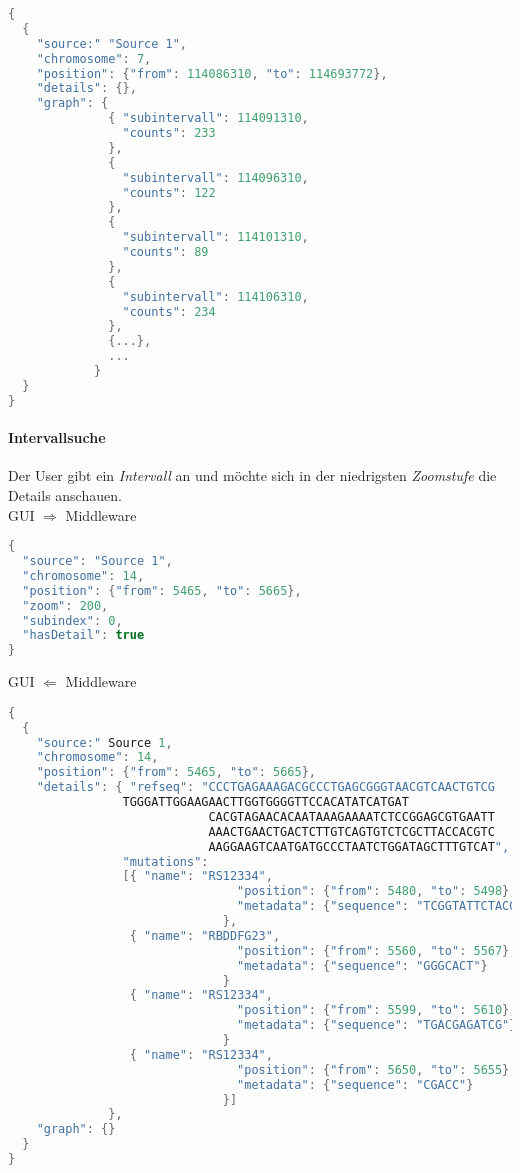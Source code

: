 \documentclass{scrartcl}
\begin{document}
\begin{lstlisting}[language=c,
commentstyle=\fontsize{12}{14.4}\selectfont,
basicstyle=\ttfamily\fontsize{10}{12}\selectfont, showstringspaces=false]
{
  {
    "source:" "Source 1",
    "chromosome": 7,
    "position": {"from": 114086310, "to": 114693772},
    "details": {},
    "graph": {
              { "subintervall": 114091310,
                "counts": 233
              },
              {
                "subintervall": 114096310,
                "counts": 122
              },
              {
                "subintervall": 114101310,
                "counts": 89
              },
              {
                "subintervall": 114106310,
                "counts": 234
              },
              {...},
              ...
            }
  }
}
\end{lstlisting}

\paragraph{Intervallsuche} Der User gibt ein \textit{Intervall} an und möchte sich in der niedrigsten \textit{Zoomstufe} die Details anschauen.\\
\newline
GUI $\Rightarrow$ Middleware
\begin{lstlisting}[language=c,
commentstyle=\fontsize{12}{14.4}\selectfont,
basicstyle=\ttfamily\fontsize{10}{12}\selectfont]
{
  "source": "Source 1",
  "chromosome": 14,
  "position": {"from": 5465, "to": 5665},
  "zoom": 200,
  "subindex": 0,
  "hasDetail": true
}
\end{lstlisting}
GUI $\Leftarrow$ Middleware
\begin{lstlisting}[language=c,
commentstyle=\fontsize{12}{14.4}\selectfont,
basicstyle=\ttfamily\fontsize{10}{12}\selectfont,showstringspaces=false]
{
  {
    "source:" Source 1,
    "chromosome": 14,
    "position": {"from": 5465, "to": 5665},
    "details": { "refseq": "CCCTGAGAAAGACGCCCTGAGCGGGTAACGTCAACTGTCG
			    TGGGATTGGAAGAACTTGGTGGGGTTCCACATATCATGAT
                            CACGTAGAACACAATAAAGAAAATCTCCGGAGCGTGAATT
                            AAACTGAACTGACTCTTGTCAGTGTCTCGCTTACCACGTC
                            AAGGAAGTCAATGATGCCCTAATCTGGATAGCTTTGTCAT",
                "mutations": 
                [{ "name": "RS12334",
                                "position": {"from": 5480, "to": 5498},
                                "metadata": {"sequence": "TCGGTATTCTACGTCTGC"}
                              },
                 { "name": "RBDDFG23",
                                "position": {"from": 5560, "to": 5567},
                                "metadata": {"sequence": "GGGCACT"}
                              }
                 { "name": "RS12334",
                                "position": {"from": 5599, "to": 5610},
                                "metadata": {"sequence": "TGACGAGATCG"}
                              }
                 { "name": "RS12334",
                                "position": {"from": 5650, "to": 5655},
                                "metadata": {"sequence": "CGACC"}
                              }]
              },
    "graph": {}
  }
}
\end{lstlisting}
\newpage
\end{document}
